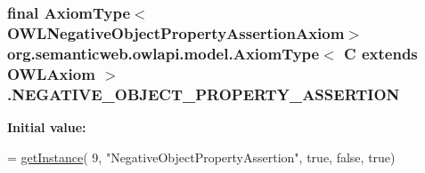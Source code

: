 \hypertarget{classorg_1_1semanticweb_1_1owlapi_1_1model_1_1_axiom_type_3_01_c_01extends_01_o_w_l_axiom_01_4_ad6ba34d24f3fa6daeba52261a9f0b8a8}{
\subsubsection[{N\-E\-G\-A\-T\-I\-V\-E\-\_\-\-O\-B\-J\-E\-C\-T\-\_\-\-P\-R\-O\-P\-E\-R\-T\-Y\-\_\-\-A\-S\-S\-E\-R\-T\-I\-O\-N}]{\setlength{\rightskip}{0pt plus 5cm}final {\bf Axiom\-Type}$<${\bf O\-W\-L\-Negative\-Object\-Property\-Assertion\-Axiom}$>$ org.\-semanticweb.\-owlapi.\-model.\-Axiom\-Type$<$ C extends {\bf O\-W\-L\-Axiom} $>$.N\-E\-G\-A\-T\-I\-V\-E\-\_\-\-O\-B\-J\-E\-C\-T\-\_\-\-P\-R\-O\-P\-E\-R\-T\-Y\-\_\-\-A\-S\-S\-E\-R\-T\-I\-O\-N\hspace{0.3cm}{\ttfamily [static]}}}\label{classorg_1_1semanticweb_1_1owlapi_1_1model_1_1_axiom_type_3_01_c_01extends_01_o_w_l_axiom_01_4_ad6ba34d24f3fa6daeba52261a9f0b8a8}
{\bfseries Initial value\-:}
\begin{DoxyCode}
= \hyperlink{classorg_1_1semanticweb_1_1owlapi_1_1model_1_1_axiom_type_3_01_c_01extends_01_o_w_l_axiom_01_4_a485e011845434c518471707a87f09339}{getInstance}(
            9, \textcolor{stringliteral}{"NegativeObjectPropertyAssertion"}, \textcolor{keyword}{true}, \textcolor{keyword}{false}, \textcolor{keyword}{true})
\end{DoxyCode}
